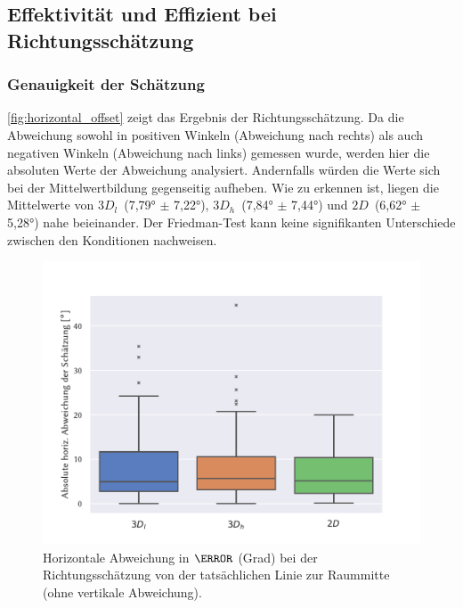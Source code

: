 \subsection{Effektivität und Effizient bei Richtungsschätzung}
\subsubsection*{Genauigkeit der Schätzung}
\autoref{fig:horizontal_offset} zeigt das Ergebnis der Richtungsschätzung.
Da die Abweichung sowohl in positiven Winkeln (Abweichung nach rechts) als auch negativen Winkeln (Abweichung nach links) gemessen wurde, werden hier die absoluten Werte der Abweichung analysiert.
Andernfalls würden die Werte sich bei der Mittelwertbildung gegenseitig aufheben.
Wie zu erkennen ist, liegen die Mittelwerte von $3D_l$~(\ang{7,79} $\pm$ \ang{7,22}), $3D_h$~(\ang{7,84} $\pm$ \ang{7,44}) und $2D$~(\ang{6,62} $\pm$ \ang{5,28}) nahe beieinander.
Der Friedman-Test kann keine signifikanten Unterschiede zwischen den Konditionen nachweisen.
\begin{figure}
    \centering
    \includegraphics[height=0.45\textheight]{figures/analysis/horizontal_offset}
    \caption{Horizontale Abweichung in $\degree$ (Grad) bei der Richtungsschätzung von der tatsächlichen Linie zur Raummitte (ohne vertikale Abweichung).}
    \label{fig:horizontal_offset}
\end{figure}

